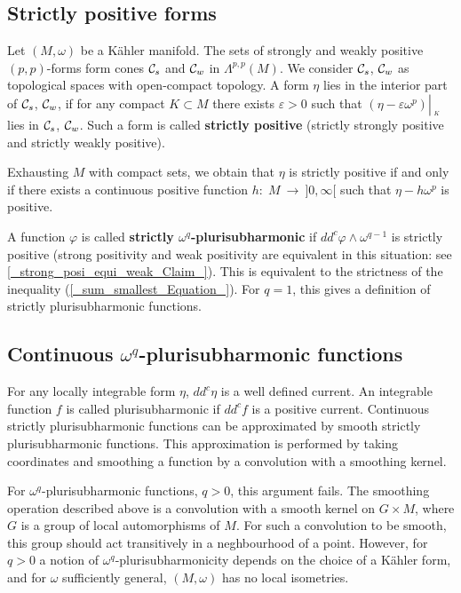 \documentclass[11pt]{article}
\numberwithin{equation}{section}
\def\eqref#1{(\ref{#1})}
\newcommand{\arrow}{{\:\longrightarrow\:}}
\newcommand{\6}{\partial}
\newcommand{\restrict}[1]{{\left|_{{\phantom{|}\!\!}_{#1}}\right.}}
\newcommand{\cac}{{\cal C}}
\renewcommand{\phi}{\varphi}
\renewcommand{\epsilon}{\varepsilon}
\newcounter{definition}[section]
\begin{document}
\subsection{Strictly positive forms}
\label{_strict_posi_Subsection_}

Let $(M, \omega)$ be a K\"ahler manifold.
The sets of strongly and weakly positive $(p,p)$-forms
form cones $\cac_s$ and $\cac_w$ in $\Lambda^{p,p}(M)$.
We consider $\cac_s$, $\cac_w$ as topological spaces
with open-compact topology. A form $\eta$
lies in the interior part of $\cac_s$, $\cac_w$,
if for any compact $K\subset M$ there exists
$\epsilon >0$ such that $(\eta- \epsilon \omega^p)\restrict K$
lies in $\cac_s$, $\cac_w$. Such a form is called 
{\bf strictly positive} (strictly strongly
positive and strictly weakly positive).

Exhausting $M$ with compact sets,
we obtain that $\eta$ is strictly positive if
and only if there exists a continuous positive
function $h:\; M \arrow ]0, \infty[$ such that
$\eta-  h\omega^p$ is positive. 

A function $\phi$ is called {\bf strictly 
$\omega^q$-plurisubharmonic} if $dd^c\phi\wedge \omega^{q-1}$
is strictly positive (strong positivity and weak
positivity are equivalent in this situation: see 
\ref{_strong_posi_equi_weak_Claim_}).
This is equivalent to the strictness of
the inequality \eqref{_sum_smallest_Equation_}.
For $q=1$, this gives a definition of strictly
plurisubharmonic functions.


\subsection{Continuous $\omega^q$-plurisubharmonic
functions}

For any locally integrable form $\eta$, 
$dd^c\eta$ is a well defined current. An 
integrable function $f$ is called plurisubharmonic
if $dd^cf$ is a positive current. Continuous
strictly plurisubharmonic functions can be approximated
by smooth strictly plurisubharmonic functions. This
approximation is performed by taking coordinates
and smoothing a function by a convolution with 
a smoothing kernel. 

For $\omega^q$-plurisubharmonic
functions, $q>0$, this argument fails. The smoothing
operation described above is a convolution with a 
smooth kernel on $G\times M$, where $G$ is a group 
of local automorphisms of $M$. For such a
convolution to be smooth, this group should
act transitively in a neghbourhood of a point.
However, for $q>0$ a notion of $\omega^q$-plurisubharmonicity
depends on the choice of a K\"ahler form,
and for $\omega$ sufficiently general, 
$(M, \omega)$ has no local isometries.
\end{document}
